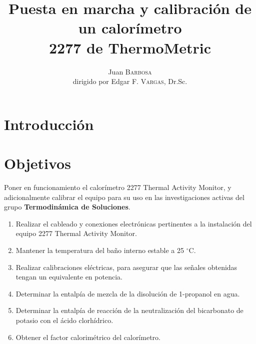 \documentclass[a0]{sciposter}
\title{Puesta en marcha y calibración de un	calorímetro\\ 2277 de ThermoMetric}
\author{Juan \textsc{Barbosa}\\dirigido por Edgar F. \textsc{Vargas}, Dr.Sc.}
\institute 
{Departamento de Qu\'imica\\
	Universidad de los Andes\\
	Cra 1 N$^\circ$ 18A - 12 Bogotá, Colombia}
\newcommand{\groupname}{\textbf{Termodinámica de Soluciones}}
\newcommand{\grad}{$^\circ$C}
\begin{document}
\maketitle

\begin{multicols}{3}

\section{Introducci\'on}

\section{Objetivos}
	Poner en funcionamiento el calorímetro 2277 Thermal Activity Monitor, y adicionalmente calibrar el equipo para su uso en las investigaciones activas del grupo \groupname.
	\begin{enumerate}
		\item Realizar el cableado y conexiones electrónicas pertinentes a la instalaci\'on del equipo 2277 Thermal Activity Monitor.
		\item Mantener la temperatura del ba\~no interno estable a 25 \grad{}.
		\item Realizar calibraciones eléctricas, para asegurar que las señales obtenidas tengan un equivalente en potencia.
		\item Determinar la entalpía de mezcla de la disolución de 1-propanol en agua.
		\item Determinar la entalpía de reacción de la neutralización del bicarbonato de potasio con el \'acido clorhídrico.
		\item Obtener el factor calorimétrico del calorímetro.
	\end{enumerate}


\end{multicols}
\end{document}
